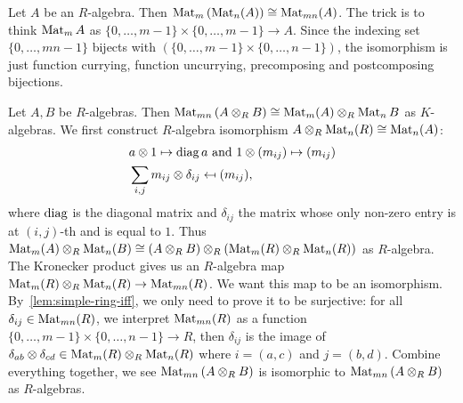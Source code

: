 \begin{construction}
  \label{con:matrix-matrix}
  Let $A$ be an $R$-algebra. Then $\operatorname{Mat}_{m}\left(\operatorname{Mat}_{n}(A)\right) \cong \operatorname{Mat}_{mn}(A)$.
  The trick is to think $\operatorname{Mat}_{m}A$ as $\{0,\dots,m-1\} \times \{0,\dots,m-1\} \to A$. Since the indexing set $\{0,\dots,mn-1\}$ bijects with $\left(\{0,\dots,m-1\}\times\{0,\dots,n-1\}\right)$, the isomorphism is just function currying, function uncurrying, precomposing and postcomposing bijections.
  \leanok
\end{construction}

\begin{construction}
  \label{con:matrix-tensor-matrix}
  Let $A, B$ be $R$-algebras. Then $\operatorname{Mat}_{mn}\left(A\otimes_{R}B\right)\cong\operatorname{Mat}_{m}(A)\otimes_{R}\operatorname{Mat}_{n}B$ as $K$-algebras. We first construct $R$-algebra isomorphism $A \otimes_{R}\operatorname{Mat}_{n}(R) \cong \operatorname{Mat}_{n}(A)$:
  \[
    \begin{aligned}
      & a \otimes 1 \mapsto \operatorname{diag}{a}~\text{and}~ 1\otimes (m_{ij}) \mapsto (m_{ij})\\
      & \sum_{i,j} m_{ij}\otimes \delta_{ij}\mapsfrom (m_{ij}),
    \end{aligned}
  \]
  where $\operatorname{diag}$ is the diagonal matrix and $\delta_{ij}$ the matrix whose only non-zero entry is at $(i,j)$-th and is equal to $1$.
  Thus $\operatorname{Mat}_{m}(A)\otimes_{R}\operatorname{Mat}_{n}(B)\cong \left(A\otimes_{R}B\right)\otimes_{R} \left(\operatorname{Mat}_{m}(R)\otimes_{R} \operatorname{Mat}_{n}(R)\right)$ as $R$-algebra.
  The Kronecker product gives us an $R$-algebra map $\operatorname{Mat}_{m}(R)\otimes_{R}\operatorname{Mat}_{n}(R) \to \operatorname{Mat}_{mn}(R)$. We want this map to be an isomorphism. By~\cref{lem:simple-ring-iff}, we only need to prove it to be surjective: for all $\delta_{ij} \in \operatorname{Mat}_{mn}(R)$, we interpret $\operatorname{Mat}_{mn}(R)$ as a function $\{0,\dots,m-1\}\times\{0,\dots,n-1\}\to R$, then $\delta_{ij}$ is the image of $\delta_{ab}\otimes \delta_{cd} \in \operatorname{Mat}_{m}(R)\otimes_{R}\operatorname{Mat}_{n}(R)$ where $i = (a, c)$ and $j = (b,d)$. Combine everything together, we see $\operatorname{Mat}_{mn}\left(A\otimes_{R}B\right)$ is isomorphic to $\operatorname{Mat}_{mn}\left(A\otimes_{R} B\right)$ as $R$-algebras.
  \leanok

\end{construction}

